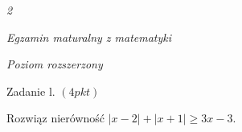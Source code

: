 \documentclass[a4paper,12pt]{article}
\begin{document}
{\it 2}

{\it Egzamin maturalny z matematyki}

{\it Poziom rozszerzony}

Zadanie l. $(4pkt)$

Rozwiąz nierówność $|x-2|+|x+1|\geq 3x-3.$
\end{document}

